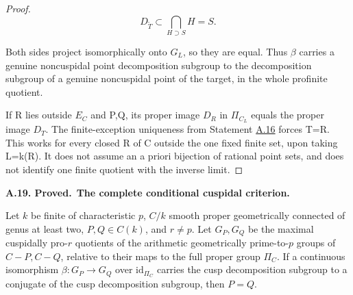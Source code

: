 \documentclass[11pt,a4paper]{article}
\newenvironment{claim}[3]{\par\medskip\noindent\hypertarget{#1}{\textbf{#1. #2.}}\ \textbf{#3.}\par\nopagebreak\smallskip\begingroup\itshape}{\endgroup\par\smallskip}
\newcommand{\statementref}[1]{\hyperlink{#1}{#1}}
\begin{document}
\begin{proof}
\[
D_{\widetilde T}\subset\bigcap_{H\supset S}H=S.
\]

Both sides project isomorphically onto \(G_L\), so they are equal. Thus \({\beta}\) carries a genuine noncuspidal point decomposition subgroup to the decomposition subgroup of a genuine noncuspidal point of the target, in the whole profinite quotient.

If R lies outside \(E_C\) and P,Q, its proper image \(D_R\) in \({\Pi}_{C_L}\) equals the proper image \(D_T\). The finite-exception uniqueness from Statement \statementref{A.16} forces T=R. This works for every closed R of C outside the one fixed finite set, upon taking L=k(R). It does not assume an a priori bijection of rational point sets, and does not identify one finite quotient with the inverse limit.


\end{proof}

\begin{claim}{A.19}{Proved}{The complete conditional cuspidal criterion}

Let $k$ be finite of characteristic $p$, $C/k$ smooth proper
geometrically connected of genus at least two, $P,Q\in C(k)$, and
$r\ne p$. Let $G_P,G_Q$ be the maximal cuspidally pro-$r$ quotients
of the arithmetic geometrically prime-to-$p$ groups of $C-P,C-Q$,
relative to their maps to the full proper group $\Pi_C$. If a
continuous isomorphism $\beta:G_P\to G_Q$ over
$\mathrm{id}_{\Pi_C}$ carries the cusp decomposition subgroup to
a conjugate of the cusp decomposition subgroup, then $P=Q$.

\end{claim}
\end{document}
